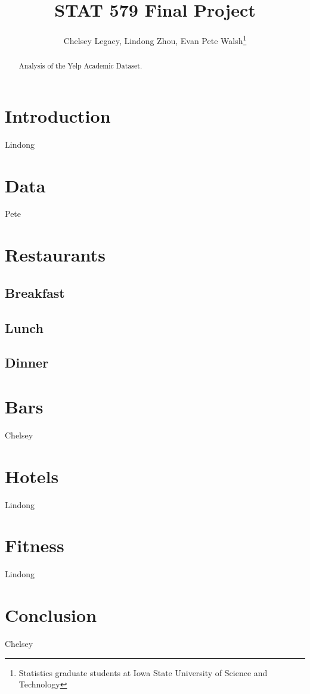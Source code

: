\documentclass[12pt]{article}
\begin{document}
\author{Chelsey Legacy, Lindong Zhou, Evan Pete Walsh\footnote{Statistics graduate students at Iowa State University of Science and Technology}}
\title{STAT 579 Final Project}
\maketitle

\begin{abstract}
Analysis of the Yelp Academic Dataset.
\end{abstract}

\newpage

\tableofcontents

\newpage

\pagestyle{fancy}
\rhead{\thepage}
\rfoot{\today}
\cfoot{}%


\section{Introduction}

Lindong


\section{Data}

Pete


\section{Restaurants}

\subsection{Breakfast}

\subsection{Lunch}

\subsection{Dinner}

\section{Bars}

Chelsey

\section{Hotels}

Lindong

\section{Fitness}

Lindong


\section{Conclusion}


Chelsey
\end{document}
